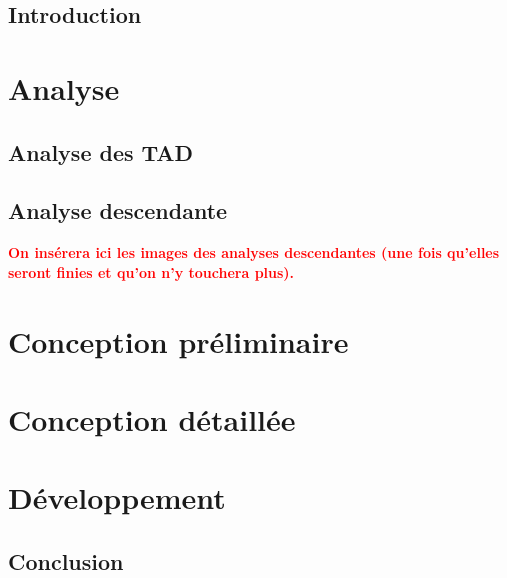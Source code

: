 \documentclass[11pt]{report}
\begin{document}
\thispagestyle{empty}
\clearpage\mbox{}\clearpage

\thispagestyle{plain}
\chapter*{Introduction}

\tableofcontents

\part{Analyse}
\chapter{Analyse des TAD}


\chapter{Analyse descendante}
 {\huge \textbf{ \textcolor{red}{On insérera ici les images des analyses descendantes (une fois qu'elles seront finies et qu'on n'y touchera plus).}} }

\setcounter{chapter}{0}
\part{Conception préliminaire}


\setcounter{chapter}{0}
\part{Conception détaillée}


\setcounter{chapter}{0}
\part{Développement}


\thispagestyle{plain}
\chapter*{Conclusion}
\end{document}
